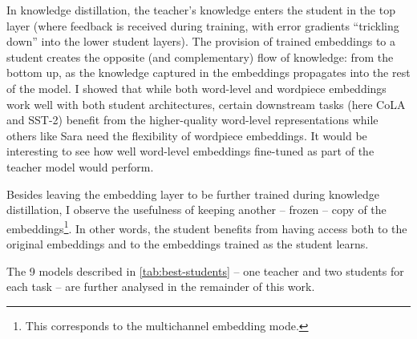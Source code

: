 \documentclass[bsc,frontabs,singlespacing,parskip,deptreport]{infthesis}
\begin{document}
{{    In knowledge distillation, the teacher's knowledge enters the student in the top layer (where feedback is received during training, with error gradients ``trickling down'' into the lower student layers).
    The provision of trained embeddings to a student creates the opposite (and complementary) flow of knowledge: from the bottom up, as the knowledge captured in the embeddings propagates into the rest of the model.
    I showed that while both word-level and wordpiece embeddings work well with both student architectures, certain downstream tasks (here CoLA and SST-2) benefit from the higher-quality word-level representations while others like Sara need the flexibility of wordpiece embeddings.
    It would be interesting to see how well word-level embeddings fine-tuned as part of the teacher model would perform.

    Besides leaving the embedding layer to be further trained during knowledge distillation, I observe the usefulness of keeping another -- frozen -- copy of the embeddings\footnote{This corresponds to the multichannel embedding mode.}. In other words, the student benefits from having access both to the original embeddings and to the embeddings trained as the student learns.

    The 9 models described in \autoref{tab:best-students} -- one teacher and two students for each task -- are further analysed in the remainder of this work.
  }
}
\end{document}
